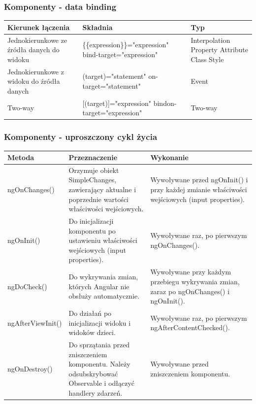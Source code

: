 \documentclass{beamer}
\begin{document}
\begin{frame}
    \frametitle{Komponenty - data binding}
    \tiny
    \begin{tabularx}{\textwidth}{X | X | X}
    Kierunek łączenia & Składnia & Typ \\
    \hline \hline
    Jednokierunkowe ze źródła danych do widoku &
    \{\{expression\}\}\newline
    [target]="expression"\newline
    bind-target="expression" &
    Interpolation\newline
    Property\newline
    Attribute\newline
    Class\newline
    Style \\
    \hline
    Jednokierunkowe z widoku do źródła danych &
    (target)="statement"\newline
    on-target="statement" &
    Event \\
    \hline
    Two-way &
    [(target)]="expression"\newline
    bindon-target="expression" &
    Two-way \\
\end{tabularx}
\end{frame}

\begin{frame}
    \frametitle{Komponenty - uproszczony cykl życia}
\tiny
\begin{tabularx}{\textwidth}{l | X | X}
    Metoda & Przeznaczenie & Wykonanie \\
    \hline \hline
    ngOnChanges() & Orzymuje obiekt SimpleChanges, zawierający aktualne i poprzednie wartości właściwości wejściowych. & Wywoływane przed ngOnInit() i przy każdej zmianie właściwości wejściowych (input properties).\\
    \hline
    ngOnInit() & Do inicjalizacji komponentu po ustawieniu właściwości wejściowych (input properties). & Wywoływane raz, po pierwszym ngOnChanges().\\
    \hline
    ngDoCheck() & Do wykrywania zmian, których Angular nie obsłuży automatycznie. & Wywoływane przy każdym przebiegu wykrywania zmian, zaraz po ngOnChanges() i ngOnInit().\\
    \hline
    ngAfterViewInit() & Do działań po inicjalizacji widoku i widoków dzieci. & Wywoływane raz, po pierwszym ngAfterContentChecked().\\
    \hline
    ngOnDestroy() & Do sprzątania przed zniszczeniem komponentu. Należy odsubskrybować Observable i odłączyć handlery zdarzeń. & Wywoływane przed zniszczeniem komponentu.\\
\end{tabularx}
\end{frame}
\end{document}
